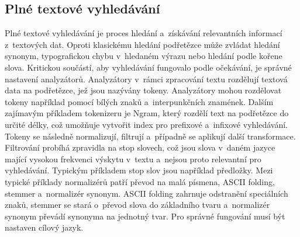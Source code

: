 \subsection{Plné textové vyhledávání}
Plné textové vyhledávání \cite{fullTextSearchMongo, fullTextJosh} je proces hledání a~získávání relevantních informací z~textových dat. Oproti klasickému hledání podřetězce může zvládat hledání synonym, typografickou chybu v~hledaném výrazu nebo hledání podle kořene slova.
\newpara
Kritickou součástí, aby vyhledávání fungovalo podle očekávání, je správné nastavení analyzátorů. Analyzátory v~rámci zpracování textu rozdělují textová data na podřetězce, jež jsou nazývány tokeny. Analyzátory mohou rozdělovat tokeny například pomocí bílých znaků a~interpunkčních znamének. Dalším zajímavým příkladem tokenizeru je Ngram, který rozdělí text na podřetězce do určité délky, což umožňuje vytvořit index pro prefixové a~infixové vyhledávání. Tokeny se následně normalizují, filtrují a~případně se aplikují další transformace. Filtrování probíhá zpravidla na stop slovech, což jsou slova v~daném jazyce mající vysokou frekvenci výskytu v~textu a~nejsou proto relevantní pro vyhledávání. Typickým příkladem stop slov jsou například předložky. Mezi typické příklady normalizérů patří převod na malá písmena, ASCII folding, stemmer a~normalizér synonym. ASCII folding zahrnuje odstranění speciálních znaků, stemmer se stará o~převod slova do základního tvaru a~normalizér synonym převádí synonyma na jednotný tvar. Pro správné fungování musí být nastaven cílový jazyk.


